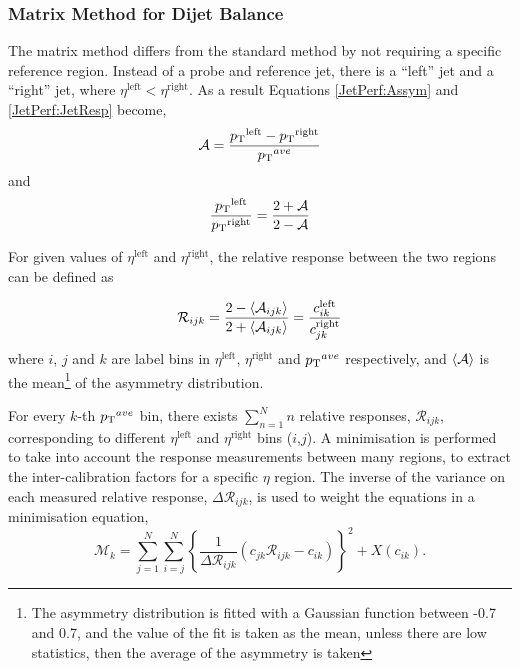 \subsubsection{Matrix Method for Dijet Balance}

The matrix method differs from the standard method by not requiring a specific reference region.
Instead of a probe and reference jet, there is a ``left'' jet and a ``right'' jet, where $\eta^{\mathrm{left}}<\eta^{\mathrm{right}}$.
As a result Equations \ref{JetPerf:Assym} and \ref{JetPerf:JetResp} become,
\begin{equation}
\mathcal{A} =\frac{\mbox{$p_{\rm T}$}{}^{\mathrm{left}} - \mbox{$p_{\rm T}$}{}^{\mathrm{right}}}{\mbox{$\mbox{$p_{\rm T}$}{}^{ave}$}{}}
\label{JetPerf:MM_Assym}
\end{equation}
and 
\begin{equation}
\frac{\mbox{$p_{\rm T}$}{}^{\mathrm{left}}}{\mbox{$p_{\rm T}$}{}^{\mathrm{right}}}=\frac{2+\mathcal{A}}{2-\mathcal{A}}
\label{JetPerf:MM_CorrectionFactor}
\end{equation}

For given values of $\eta^{\mathrm{left}}$ and $\eta^{\mathrm{right}}$, the relative response between the two regions can be defined as 

\begin{equation}
\mathcal{R}_{ijk}= \frac{2-\mbox{$\langle \mathcal{A}_{ ijk} \rangle$}}{2+\mbox{$\langle \mathcal{A}_{ ijk} \rangle$}} = \frac{ c_{ik}^{\mathrm{left}}}{ c_{jk}^{\mathrm{right}}}
\label{JetPerf:MM_Response_Measured}
\end{equation}
where $i$, $j$ and $k$ are label bins in  $\eta^{\mathrm{left}}$, $\eta^{\mathrm{right}}$ and $\mbox{$\mbox{$p_{\rm T}$}{}^{ave}$}{}$ respectively, and $\mbox{$\langle \mathcal{A} \rangle$}$ is the mean\footnote{The asymmetry distribution is fitted with a Gaussian function between -0.7 and 0.7, and the value of the fit is taken as the mean, unless there are low statistics, then the average of the asymmetry is taken} of the asymmetry distribution. 


For every $k$-th $\mbox{$\mbox{$p_{\rm T}$}{}^{ave}$}{}$ bin, there exists $\sum\limits^N_{n=1}n$ relative responses, $\mathcal{R}_{ ijk}$, corresponding to different $\eta^{\mathrm{left}}$ and $\eta^{\mathrm{right}}$ bins ($i$,$j$).
A minimisation is performed to take into account the response measurements between many regions, to extract the inter-calibration factors for a specific $\eta$ region.
The inverse of the variance on each measured relative response, $\Delta\mathcal{R}_{ijk}$, is used to weight the equations in a minimisation equation,
\begin{equation}
\mathcal{M}_{k} = \sum\limits^N_{j=1} \sum\limits^N_{i=j}\left\{\frac{1}{\Delta\mathcal{R}_{ ijk}}( c_{jk}\mathcal{R}_{ ijk}- c_{ik} )\right\}^2 + X(c_{ik}).
\label{JetPerf:MM_Final}
\end{equation}

